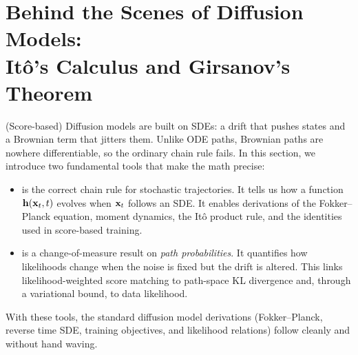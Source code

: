 \chapter{Behind the Scenes of Diffusion Models:\\ It\^o’s Calculus and Girsanov's Theorem}\label{app:Ito}


(Score-based) Diffusion models are built on SDEs: a drift that pushes states and a Brownian term that jitters them. Unlike ODE paths, Brownian paths are nowhere differentiable, so the ordinary chain rule fails. In this section, we introduce two fundamental tools that make the math precise:
\begin{itemize}
\item {} is the correct chain rule for stochastic trajectories. It tells us how a function ${\mathbf{h}}({\mathbf{x}}_t,t)$ evolves when ${\mathbf{x}}_t$ follows an SDE. It enables derivations of the Fokker–Planck equation, moment dynamics, the It\^o product rule, and the identities used in score-based training.
\item {} is a change-of-measure result on \emph{path probabilities}. It quantifies how likelihoods change when the noise is fixed but the drift is altered. This links likelihood-weighted score matching to path-space KL divergence
and, through a variational bound, to data likelihood.
\end{itemize}

With these tools, the standard diffusion model derivations (Fokker–Planck, reverse time SDE, training objectives, and likelihood relations) follow cleanly and without hand waving.


